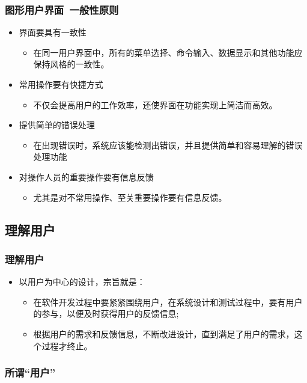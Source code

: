 \documentclass{beamer}
\begin{document}
\begin{frame}
	\frametitle{图形用户界面~{\small 一般性原则}}
	\beamertemplatetransparentcovereddynamicmedium
	\begin{itemize}[<+->]
		\item 界面要具有一致性
		\begin{itemize}
			\item 在同一用户界面中，所有的菜单选择、命令输入、数据显示和其他功能应保持风格的一致性。
		\end{itemize}
		\item 常用操作要有快捷方式
		\begin{itemize}
			\item 不仅会提高用户的工作效率，还使界面在功能实现上简洁而高效。
		\end{itemize}
		\item 提供简单的错误处理
		\begin{itemize}
			\item 在出现错误时，系统应该能检测出错误，并且提供简单和容易理解的错误处理功能
		\end{itemize}
		\item 对操作人员的重要操作要有信息反馈
		\begin{itemize}
			\item 尤其是对不常用操作、至关重要操作要有信息反馈。
		\end{itemize}
	\end{itemize}
\end{frame}

\subsection{理解用户}
\begin{frame}
	\frametitle{理解用户}
	\beamertemplatetransparentcovereddynamicmedium
	\begin{itemize}[<+->]
		\item 以用户为中心的设计，宗旨就是：
		\begin{itemize}
			\item 在软件开发过程中要紧紧围绕用户，在系统设计和测试过程中，要有用户的参与，以便及时获得用户的反馈信息;
			\item 根据用户的需求和反馈信息，不断改进设计，直到满足了用户的需求，这个过程才终止。
		\end{itemize}
	\end{itemize}
\end{frame}

\begin{frame}
	\frametitle{所谓“用户”}

\end{frame}
\end{document}
